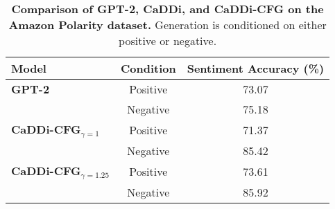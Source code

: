 \begin{table}[h]
    \vspace{-10pt}
    \centering
    \caption{\textbf{Comparison of GPT-2, CaDDi, and CaDDi-CFG on the Amazon Polarity dataset.} Generation is
      conditioned on either positive or negative.}
    \vspace{3pt}
    \begin{adjustbox}{max width=0.9\linewidth}
    \begin{tabular}{lcc}
    \toprule
        \textbf{Model} 
        & \textbf{Condition} 
        & \textbf{Sentiment Accuracy (\%)} \\
    \midrule
        \textbf{GPT-2}  & Positive & 73.07 \\
                        & Negative & 75.18 \\
    \midrule
        \textbf{CaDDi-CFG\(_{\gamma=1}\)}  & Positive & 71.37 \\
                        & Negative & 85.42 \\
    \midrule
        \textbf{CaDDi-CFG\(_{\gamma=1.25}\)} & Positive & 73.61 \\
                           & Negative & 85.92 \\
    \bottomrule
    \end{tabular}
    \end{adjustbox}
    \label{tab:sentiment-comparison}
    \vspace{-5pt}
\end{table}
